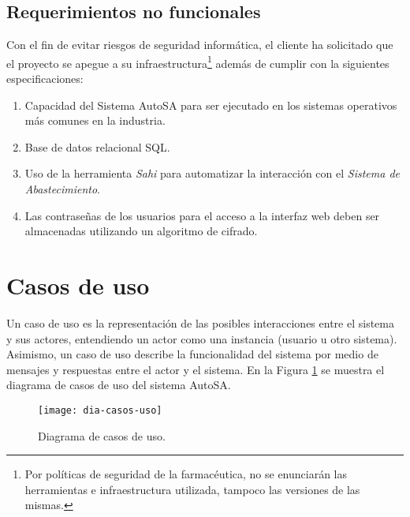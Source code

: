 \subsection{Requerimientos no funcionales}\label{sec:nonfunctional-req}
Con el fin de evitar riesgos de seguridad informática, el cliente ha solicitado que el proyecto se apegue a su infraestructura\footnote{Por políticas de seguridad de la farmacéutica, no se enunciarán las herramientas e infraestructura utilizada, tampoco las versiones de las mismas.} además de cumplir con la siguientes especificaciones:
\begin{enumerate}
\item Capacidad del Sistema AutoSA para ser ejecutado en los sistemas operativos más comunes en la industria.
\item Base de datos relacional SQL.
\item Uso de la herramienta \textit{Sahi} para automatizar la interacción con el \textit{Sistema de Abastecimiento}.
\item Las contraseñas de los usuarios para el acceso a la interfaz web deben ser almacenadas utilizando un algoritmo de cifrado.
\end{enumerate}




\section{Casos de uso}\label{sec:casos-uso}
Un caso de uso es la representación de las posibles interacciones entre el sistema y sus actores, entendiendo un actor como una instancia (usuario u otro sistema). Asimismo, un caso de uso describe la funcionalidad del sistema por medio de mensajes y respuestas entre el actor y el sistema\cite{ApressSE}. En la Figura \ref{fig:dia-casos-uso} se muestra el diagrama de casos de uso del sistema AutoSA.

\begin{figure}[h]
  \centering
  \texttt{[image: dia-casos-uso]} 
  \caption{Diagrama de casos de uso.}
  \label{fig:dia-casos-uso}
\end{figure}

